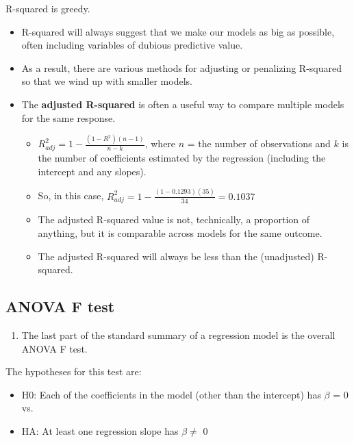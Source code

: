 \documentclass[
]{book}
\providecommand{\tightlist}{%
  \setlength{\itemsep}{0pt}\setlength{\parskip}{0pt}}
\begin{document}
R-squared is greedy.

\begin{itemize}
\tightlist
\item
  R-squared will always suggest that we make our models as big as possible, often including variables of dubious predictive value.
\item
  As a result, there are various methods for adjusting or penalizing R-squared so that we wind up with smaller models.
\item
  The \textbf{adjusted R-squared} is often a useful way to compare multiple models for the same response.

  \begin{itemize}
  \tightlist
  \item
    \(R^2_{adj} = 1 - \frac{(1-R^2)(n - 1)}{n - k}\), where \(n\) = the number of observations and \(k\) is the number of coefficients estimated by the regression (including the intercept and any slopes).
  \item
    So, in this case, \(R^2_{adj} = 1 - \frac{(1 - 0.1293)(35)}{34} = 0.1037\)
  \item
    The adjusted R-squared value is not, technically, a proportion of anything, but it is comparable across models for the same outcome.
  \item
    The adjusted R-squared will always be less than the (unadjusted) R-squared.
  \end{itemize}
\end{itemize}

\hypertarget{anova-f-test}{%
\subsection{ANOVA F test}\label{anova-f-test}}

\begin{enumerate}
\def\labelenumi{\arabic{enumi}.}
\setcounter{enumi}{4}
\tightlist
\item
  The last part of the standard summary of a regression model is the overall ANOVA F test.
\end{enumerate}

The hypotheses for this test are:

\begin{itemize}
\tightlist
\item
  H0: Each of the coefficients in the model (other than the intercept) has \(\beta\) = 0 vs.
\item
  HA: At least one regression slope has \(\beta \neq\) 0
\end{itemize}
\end{document}
